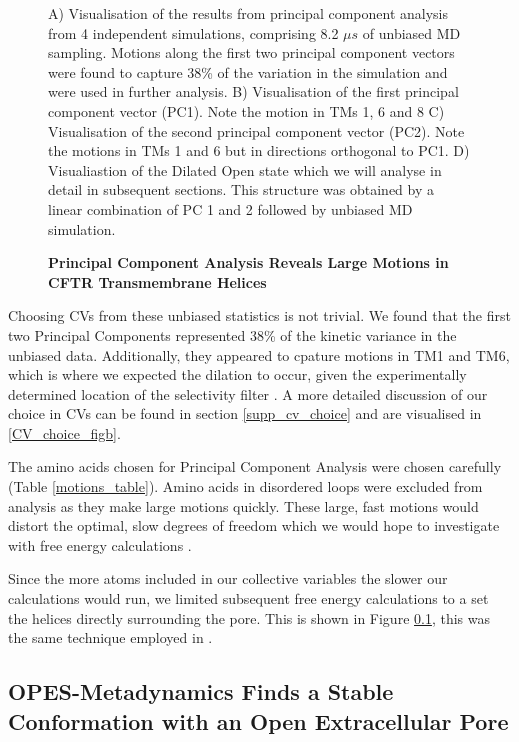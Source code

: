 \begin{figure}
	\caption[Principal Component Analysis Reveals Large Motions in CFTR Transmembrane Helices] {\textbf{Principal Component Analysis Reveals Large Motions in CFTR Transmembrane Helices}}{A) Visualisation of the results from principal component analysis from 4 independent simulations, comprising 8.2 $\mu s$ of unbiased MD sampling. Motions along the first two principal component vectors were found to capture 38\% of the variation in the simulation and were used in further analysis. B) Visualisation of the first principal component vector (PC1). Note the motion in TMs 1, 6 and 8 C) Visualisation of the second principal component vector (PC2). Note the motions in TMs 1 and 6 but in directions orthogonal to PC1. D) Visualiastion of the Dilated Open state which we will analyse in detail in subsequent sections. This structure was obtained by a linear combination of PC 1 and 2 followed by unbiased MD simulation.} 
	\label{PCA_motions}
\end{figure}

Choosing CVs from these unbiased statistics is not trivial. We found that the first two Principal Components represented 38\% of the kinetic variance in the unbiased data. Additionally, they appeared to cpature motions in TM1 and TM6, which is where we expected the dilation to occur, given the experimentally determined location of the selectivity filter \cite{linsdell2018, negoda2018, negoda2019}. A more detailed discussion of our choice in CVs can be found in section \ref{supp_cv_choice} and are visualised in \ref{CV_choice_figb}. 

The amino acids chosen for Principal Component Analysis were chosen carefully (Table \ref{motions_table}). Amino acids in disordered loops were excluded from analysis as they make large motions quickly. These large, fast motions would distort the optimal, slow degrees of freedom which we would hope to investigate with free energy calculations \cite{noe2001}. 

Since the more atoms included in our collective variables the slower our calculations would run, we limited subsequent free energy calculations to a set the helices directly surrounding the pore. This is shown in Figure \ref{}, this was the same technique employed in \cite{hoffman2018}.

\subsection{OPES-Metadynamics Finds a Stable Conformation with an Open Extracellular Pore}

